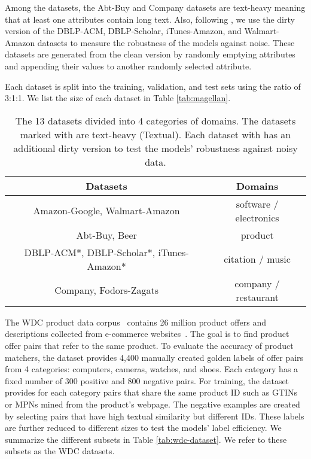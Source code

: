 Among the datasets, the Abt-Buy and Company datasets are text-heavy meaning that
at least one attributes contain long text. 
Also, following \cite{Mudgal:2018:DeepMatcher},
we use the dirty version of the DBLP-ACM, DBLP-Scholar, iTunes-Amazon, and Walmart-Amazon datasets
to measure the robustness of the models against noise. 
These datasets are generated from the clean version by
randomly emptying attributes and appending their values
to another randomly selected attribute.

Each dataset is split into the training, validation, and test sets using the ratio of \textsf{3:1:1}.
We list the size of each dataset in Table \ref{tab:magellan}.

\begin{table}[t]
\small
    \centering
    \caption{\small The 13 datasets divided into 4 categories of domains. 
    The datasets marked with  are text-heavy (Textual).
    Each dataset with  has an additional dirty version to test the models' robustness against
    noisy data. }
    \vspace{-3mm}
    \label{tab:magellan-dataset}
\begin{tabular}{cc}
\toprule
\textbf{Datasets}                              & \textbf{Domains}                \\ \midrule
Amazon-Google, Walmart-Amazon         & software / electronics \\
Abt-Buy, Beer                         & product                \\
DBLP-ACM*, DBLP-Scholar*, iTunes-Amazon* & citation / music       \\
Company, Fodors-Zagats                & company / restaurant   \\ \bottomrule
\end{tabular}
\vspace{-3mm}\end{table}




The WDC product data corpus~\cite{Primpeli:2019:WDC} contains 26 million product offers and descriptions collected from e-commerce 
websites~\cite{wdc}. The goal is to find product offer pairs that refer to the same product.
To evaluate the accuracy of product matchers, the dataset provides 4,400 manually created 
golden labels of offer pairs from 4 categories: computers, cameras, watches, and shoes.
Each category has a fixed number of 300 positive and 800 negative pairs.
For training, the dataset provides for each category 
pairs that share the same product ID such as GTINs or MPNs mined from the product's webpage.
The negative examples are created by selecting pairs that have high textual similarity but different IDs.
These labels are further reduced to different sizes to test the models' label efficiency.
We summarize the different subsets in Table \ref{tab:wdc-dataset}.
We refer to these subsets as the WDC datasets.


